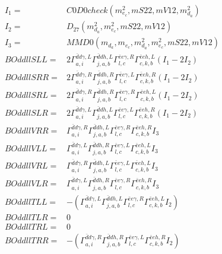 \documentclass[A4,landscape]{article}
\begin{document}
\begin{align} 
I_1 = & C0D0check(m^2_{e_{{c}}}, mS22, mV12, m^2_{d_{{a}}}) \\ 
I_2 = & D_{27}(m^2_{d_{{a}}}, m^2_{e_{{c}}}, mS22, mV12) \\ 
I_3 = & MMD0(m_{d_{{a}}}, m_{e_{{c}}}, m^2_{d_{{a}}}, m^2_{e_{{c}}}, mS22, mV12) \\ 
  BOddllSLL= & 2  \Gamma^{\bar{d}d \gamma ,L}_{a, i} \Gamma^{\bar{d}d h ,L}_{j, a, b} \Gamma^{\bar{e}e \gamma ,R}_{l, c} \Gamma^{\bar{e}e h ,L}_{c, k, b} (I_1 - 2 I_2) \\ 
  BOddllSRR= & 2  \Gamma^{\bar{d}d \gamma ,R}_{a, i} \Gamma^{\bar{d}d h ,R}_{j, a, b} \Gamma^{\bar{e}e \gamma ,L}_{l, c} \Gamma^{\bar{e}e h ,R}_{c, k, b} (I_1 - 2 I_2) \\ 
  BOddllSRL= & 2  \Gamma^{\bar{d}d \gamma ,R}_{a, i} \Gamma^{\bar{d}d h ,R}_{j, a, b} \Gamma^{\bar{e}e \gamma ,R}_{l, c} \Gamma^{\bar{e}e h ,L}_{c, k, b} (I_1 - 2 I_2) \\ 
  BOddllSLR= & 2  \Gamma^{\bar{d}d \gamma ,L}_{a, i} \Gamma^{\bar{d}d h ,L}_{j, a, b} \Gamma^{\bar{e}e \gamma ,L}_{l, c} \Gamma^{\bar{e}e h ,R}_{c, k, b} (I_1 - 2 I_2) \\ 
  BOddllVRR= &  \Gamma^{\bar{d}d \gamma ,R}_{a, i} \Gamma^{\bar{d}d h ,L}_{j, a, b} \Gamma^{\bar{e}e \gamma ,R}_{l, c} \Gamma^{\bar{e}e h ,R}_{c, k, b} I_3 \\ 
  BOddllVLL= &  \Gamma^{\bar{d}d \gamma ,L}_{a, i} \Gamma^{\bar{d}d h ,R}_{j, a, b} \Gamma^{\bar{e}e \gamma ,L}_{l, c} \Gamma^{\bar{e}e h ,L}_{c, k, b} I_3 \\ 
  BOddllVRL= &  \Gamma^{\bar{d}d \gamma ,R}_{a, i} \Gamma^{\bar{d}d h ,L}_{j, a, b} \Gamma^{\bar{e}e \gamma ,L}_{l, c} \Gamma^{\bar{e}e h ,L}_{c, k, b} I_3 \\ 
  BOddllVLR= &  \Gamma^{\bar{d}d \gamma ,L}_{a, i} \Gamma^{\bar{d}d h ,R}_{j, a, b} \Gamma^{\bar{e}e \gamma ,R}_{l, c} \Gamma^{\bar{e}e h ,R}_{c, k, b} I_3 \\ 
  BOddllTLL= & -( \Gamma^{\bar{d}d \gamma ,L}_{a, i} \Gamma^{\bar{d}d h ,L}_{j, a, b} \Gamma^{\bar{e}e \gamma ,R}_{l, c} \Gamma^{\bar{e}e h ,L}_{c, k, b} I_2) \\ 
  BOddllTLR= & 0 \\ 
  BOddllTRL= & 0 \\ 
  BOddllTRR= & -( \Gamma^{\bar{d}d \gamma ,R}_{a, i} \Gamma^{\bar{d}d h ,R}_{j, a, b} \Gamma^{\bar{e}e \gamma ,L}_{l, c} \Gamma^{\bar{e}e h ,R}_{c, k, b} I_2) \\ 
\end{align} 
\end{document}
